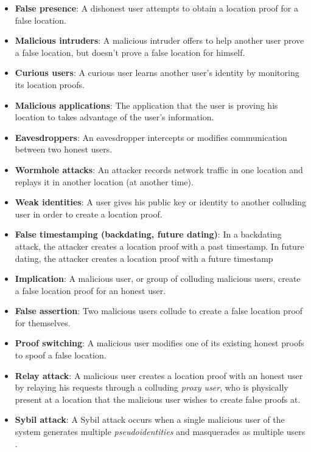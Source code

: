 \begin{itemize}
	\item[] \textbf{False presence}: A dishonest user attempts to obtain a location proof for a false location.
	\item[] \textbf{Malicious intruders}: A malicious intruder offers to help another user prove a false location, but doesn't prove a false location for himself.
	\item[] \textbf{Curious users}: A curious user learns another user's identity by monitoring its location proofs.
	\item[] \textbf{Malicious applications}: The application that the user is proving his location to takes advantage of the user's information.
	\item[] \textbf{Eavesdroppers}: An eavesdropper intercepts or modifies communication between two honest users.
	\item[] \textbf{Wormhole attacks}: An attacker records network traffic in one location and replays it in another location (at another time).
	\item[] \textbf{Weak identities}: A user gives his public key or identity to another colluding user in order to create a location proof.
	\item[] \textbf{False timestamping (backdating, future dating)}: In a backdating attack, the attacker creates a location proof with a past timestamp. In future dating, the attacker creates a location proof with a future timestamp
	\item[] \textbf{Implication}: A malicious user, or group of colluding malicious users, create a false location proof for an honest user.
	\item[] \textbf{False assertion}: Two malicious users collude to create a false location proof for themselves.
	\item[] \textbf{Proof switching}: A malicious user modifies one of its existing honest proofs to spoof a false location.
	\item[] \textbf{Relay attack}: A malicious user creates a location proof with an honest user by relaying his requests through a colluding \textit{proxy user}, who is physically present at a location that the malicious user wishes to create false proofs at.
	\item[] \textbf{Sybil attack}: A Sybil attack occurs when a single malicious user of the system generates multiple \textit{pseudoidentities} and masquerades as multiple users \cite{sybil}.
\end{itemize}